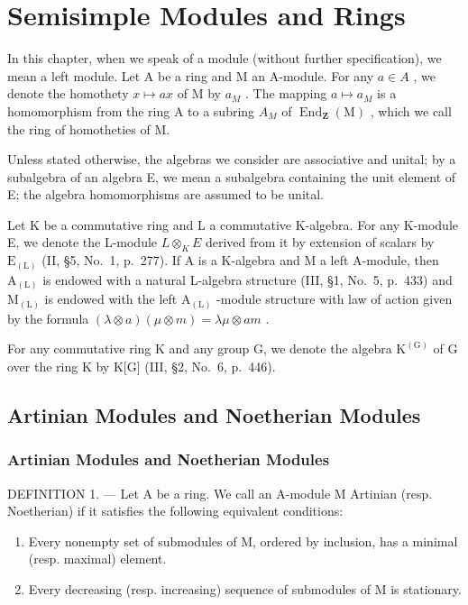 \BourbakiMainMatter
\setcounter{chapter}{7}
\chapter{Semisimple Modules and Rings}

In this chapter, when we speak of a module (without further specification), we mean a left module. Let A be a ring and M an A-module. For any \(a \in A\) , we denote the homothety \(x \mapsto ax\) of M by \(a_{M}\) . The mapping \(a \mapsto a_{M}\) is a homomorphism from the ring A to a subring \(A_{M}\) of \(\operatorname{End}_{\mathbf{Z}}(\mathrm{M})\) , which we call the ring of homotheties of M.

Unless stated otherwise, the algebras we consider are associative and unital; by a subalgebra of an algebra E, we mean a subalgebra containing the unit element of E; the algebra homomorphisms are assumed to be unital.

Let K be a commutative ring and L a commutative K-algebra. For any K-module E, we denote the L-module \(L \otimes_{K} E\) derived from it by extension of scalars by \(\mathrm{E}_{(\mathrm{L})}\) (II, §5, No.~1, p.~277). If A is a K-algebra and M a left A-module, then \(\mathrm{A}_{(\mathrm{L})}\) is endowed with a natural L-algebra structure (III, §1, No.~5, p.~433) and \(\mathrm{M}_{(\mathrm{L})}\) is endowed with the left \(\mathrm{A}_{(\mathrm{L})}\) -module structure with law of action given by the formula \((\lambda \otimes a)(\mu \otimes m) = \lambda \mu \otimes am\) .

For any commutative ring K and any group G, we denote the algebra \(\mathrm{K}^{(\mathrm{G})}\) of G over the ring K by K{[}G{]} (III, §2, No.~6, p.~446).

\section{Artinian Modules and Noetherian Modules}

\subsection{Artinian Modules and Noetherian Modules}

DEFINITION 1. --- Let A be a ring. We call an A-module M Artinian (resp. Noetherian) if it satisfies the following equivalent conditions:

\begin{enumerate}
\def\labelenumi{(\roman{enumi})}
\item
  Every nonempty set of submodules of M, ordered by inclusion, has a minimal (resp. maximal) element.
\item
  Every decreasing (resp. increasing) sequence of submodules of M is stationary.
\end{enumerate}

